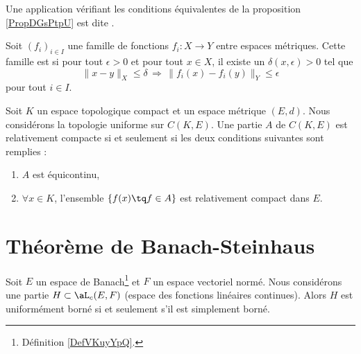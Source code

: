 \begin{definition}
    Une application vérifiant les conditions équivalentes de la proposition \ref{PropDGsPtpU} est dite .
\end{definition}

\begin{definition}  \label{DefUWmVBcZ}
    Soit \( (f_i)_{i\in I}\) une famille de fonctions \( f_i\colon X\to Y\) entre espaces métriques. Cette famille est  si pour tout \( \epsilon>0\) et pour tout \( x\in X\), il existe un \( \delta(x,\epsilon)>0\) tel que
    \begin{equation}
        \| x-y \|_X\leq \delta\,\Rightarrow\,\| f_i(x)-f_i(y) \|_Y\leq \epsilon
    \end{equation}
    pour tout \( i\in I\).
\end{definition}

\begin{theorem}        \label{ThoKRbtpah}
    Soit \( K\) un espace topologique compact et un espace métrique \( (E,d)\). Nous considérons la topologie uniforme sur \( C(K,E)\). Une partie \( A\) de \( C(K,E)\) est relativement compacte si et seulement si les deux conditions suivantes sont remplies :
    \begin{enumerate}
        \item
            \( A\) est équicontinu,
        \item
            \( \forall x\in K\), l'ensemble \( \{ f(x)\tq f\in A \}\) est relativement compact dans \( E\).
    \end{enumerate}
\end{theorem}

\section{Théorème de Banach-Steinhaus}

\begin{theorem} \label{ThoPFBMHBN}
    Soit \( E\) un espace de Banach\footnote{Définition \ref{DefVKuyYpQ}.} et \( F\) un espace vectoriel normé. Nous considérons une partie \( H\subset \aL_c(E,F)\) (espace des fonctions linéaires continues). Alors \( H\) est uniformément borné si et seulement s'il est simplement borné.
\end{theorem}

